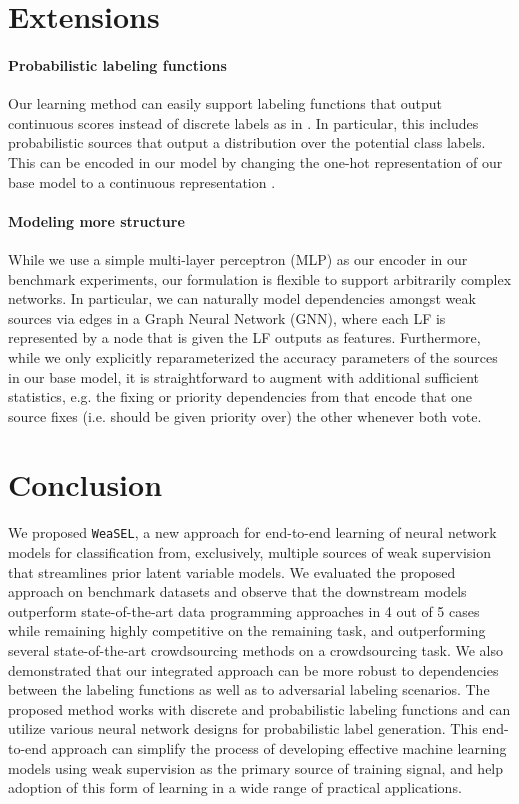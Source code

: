 \documentclass{article}
\newcommand{\weasel}{\texttt{WeaSEL}}\newcommand{\brackets}[1]{\left( #1 \right)}
\begin{document}
\section{Extensions}
\label{Extension}
\paragraph{Probabilistic labeling functions}
Our learning method can easily support labeling functions that output continuous scores instead of discrete labels as in \cite{chatterjee2019data}. In particular, this includes probabilistic sources that output a distribution over the potential class labels.
This can be encoded in our model by changing the one-hot representation of our base model to a continuous representation .

\paragraph{Modeling more structure}
While we use a simple multi-layer perceptron (MLP) as our encoder  in our benchmark experiments, our formulation is flexible to support arbitrarily complex networks. In particular, we can naturally model dependencies amongst weak sources via edges in a Graph Neural Network (GNN), where each LF is represented by a node that is given the LF outputs as features.
Furthermore, while  we only explicitly reparameterized  the accuracy parameters of the sources in our base model, it is straightforward to augment  with additional sufficient statistics, e.g. the fixing or priority dependencies from \cite{DP, MisspecificationInDP} that encode that one source fixes (i.e. should be given priority over) the other whenever both vote.
 
\section{Conclusion}
We proposed \weasel, a new approach for end-to-end learning of  neural network models for classification from, exclusively, multiple sources of weak supervision that streamlines prior latent variable models. 
We evaluated the proposed approach on benchmark datasets and observe that the downstream models outperform state-of-the-art data programming approaches in 4 out of 5 cases while remaining highly competitive on the remaining task, and outperforming several state-of-the-art crowdsourcing methods on a crowdsourcing task. 
We also demonstrated that our integrated approach can be more robust to dependencies between the labeling functions as well as to adversarial labeling scenarios. 
The proposed method works with discrete and probabilistic labeling functions and can utilize various neural network designs for probabilistic label generation. 
This end-to-end approach can simplify the process of developing effective machine learning models using weak supervision as the primary source of training signal, 
and help adoption of this form of learning in a wide range of practical applications.
%
 
\end{document}
